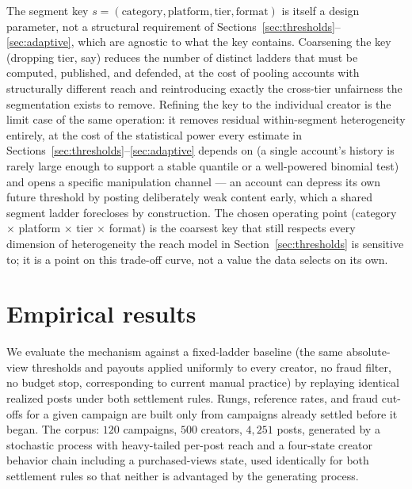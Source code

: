 \documentclass[11pt]{article}
\begin{document}
The segment key $s = (\text{category}, \text{platform}, \text{tier}, \text{format})$ is itself a
design parameter, not a structural requirement of Sections~\ref{sec:thresholds}–\ref{sec:adaptive},
which are agnostic to what the key contains. Coarsening the key (dropping tier, say) reduces the
number of distinct ladders that must be computed, published, and defended, at the cost of pooling
accounts with structurally different reach and reintroducing exactly the cross-tier unfairness the
segmentation exists to remove. Refining the key to the individual creator is the limit case of the
same operation: it removes residual within-segment heterogeneity entirely, at the cost of the
statistical power every estimate in Sections~\ref{sec:thresholds}–\ref{sec:adaptive} depends on (a
single account's history is rarely large enough to support a stable quantile or a well-powered
binomial test) and opens a specific manipulation channel — an account can depress its own future
threshold by posting deliberately weak content early, which a shared segment ladder forecloses by
construction. The chosen operating point (category $\times$ platform $\times$ tier $\times$ format)
is the coarsest key that still respects every dimension of heterogeneity the reach model in
Section~\ref{sec:thresholds} is sensitive to; it is a point on this trade-off curve, not a value the
data selects on its own.

\section{Empirical results}
\label{sec:results}

We evaluate the mechanism against a fixed-ladder baseline (the same absolute-view thresholds and
payouts applied uniformly to every creator, no fraud filter, no budget stop, corresponding to
current manual practice) by replaying identical realized posts under both settlement rules. Rungs,
reference rates, and fraud cut-offs for a given campaign are built only from campaigns already
settled before it began. The corpus: $120$ campaigns, $500$ creators, $4{,}251$ posts, generated by
a stochastic process with heavy-tailed per-post reach and a four-state creator behavior chain
including a purchased-views state, used identically for both settlement rules so that neither is
advantaged by the generating process.
\end{document}
